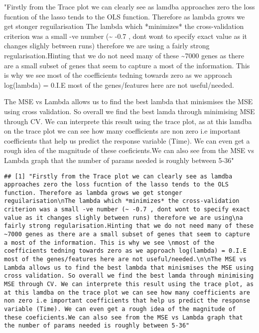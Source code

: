 \documentclass[
]{article}
\newenvironment{Shaded}{\begin{snugshade}}{\end{snugshade}}
\newcommand{\StringTok}[1]{\textcolor[rgb]{0.31,0.60,0.02}{#1}}
\begin{document}
\begin{Shaded}
\begin{Highlighting}[]
\StringTok{"Firstly from the Trace plot we can clearly see as lamdba approaches zero the loss fucntion of the lasso tends to the OLS function. Therefore as lambda grows we get stonger reguilarisation}
\StringTok{The lambda which *minimizes* the cross{-}validation criterion was a small {-}ve number (\textasciitilde{} {-}0.7 , dont wont to specify exact value as it changes slighly between runs) therefore we are using}
\StringTok{a fairly strong regularisation.Hinting that we do not need many of these \textasciitilde{}7000 genes as there are a small subset of genes that seem to capture a most of the information. This is why we see }
\StringTok{most of the coefficients tedning towards zero as we approach log(lambda) = 0.I.E most of the genes/features here are not useful/needed.}

\StringTok{The MSE vs Lambda allows us to find the best lambda that minismises the MSE using cross validation. So overall we find the best lamda through minimising MSE through CV. We can interprete this result using the trace plot, as at this lamdba on the trace plot we can see how many coefficients are non zero i.e important coefficients that help us predict the response variable (Time). We can even get a rough idea of the magnitude of these coeficients.We can also see from the MSE vs Lambda graph that the number of params needed is roughly between 5{-}36"}
\end{Highlighting}
\end{Shaded}

\begin{verbatim}
## [1] "Firstly from the Trace plot we can clearly see as lamdba approaches zero the loss fucntion of the lasso tends to the OLS function. Therefore as lambda grows we get stonger reguilarisation\nThe lambda which *minimizes* the cross-validation criterion was a small -ve number (~ -0.7 , dont wont to specify exact value as it changes slighly between runs) therefore we are using\na fairly strong regularisation.Hinting that we do not need many of these ~7000 genes as there are a small subset of genes that seem to capture a most of the information. This is why we see \nmost of the coefficients tedning towards zero as we approach log(lambda) = 0.I.E most of the genes/features here are not useful/needed.\n\nThe MSE vs Lambda allows us to find the best lambda that minismises the MSE using cross validation. So overall we find the best lamda through minimising MSE through CV. We can interprete this result using the trace plot, as at this lamdba on the trace plot we can see how many coefficients are non zero i.e important coefficients that help us predict the response variable (Time). We can even get a rough idea of the magnitude of these coeficients.We can also see from the MSE vs Lambda graph that the number of params needed is roughly between 5-36"
\end{verbatim}
\end{document}
